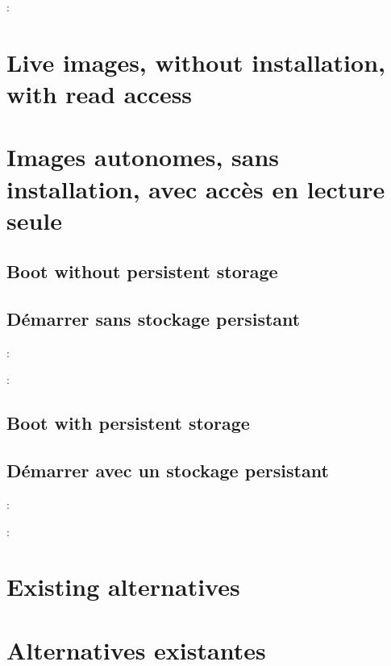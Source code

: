 :
\begin{itmz}
\item{\ml{\todo}
{\todo}}
\end{itmz}

\ml
{\section{Live images, without installation, with read access}}
{\section{Images autonomes, sans installation, avec accès en lecture seule}}

\ml
{\subsection{Boot without persistent storage}}
{\subsection{Démarrer sans stockage persistant}}

:
\begin{itmz}
\item{\ml{\todo}
{\todo}}
\end{itmz}

:
\begin{itmz}
\item{\ml{\todo}
{\todo}}
\end{itmz}

\ml
{\subsection{Boot with persistent storage}}
{\subsection{Démarrer avec un stockage persistant}}

:
\begin{itmz}
\item{\ml{\todo}
{\todo}}
\end{itmz}

:
\begin{itmz}
\item{\ml{\todo}
{\todo}}
\end{itmz}

\ml
{\section{Existing alternatives}}
{\section{Alternatives existantes}}
